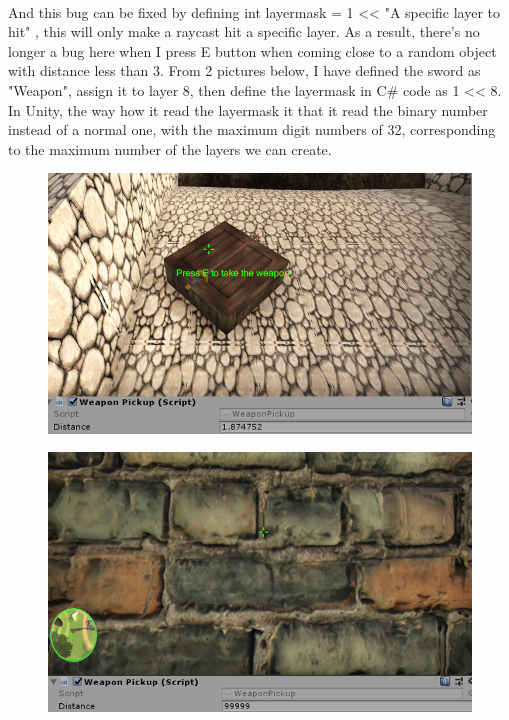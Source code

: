 \documentclass[a4paper, 13pt]{extarticle}
\begin{document}
{\begin{figure}[h]
\begin{minipage}{.5\textwidth}
			\label{fig:test40}
			\centering
		\end{minipage}
	\end{figure} \\
	And this bug can be fixed by defining int layermask = 1 << "A specific layer to hit" , this will only make a raycast hit a specific layer. As a result, there's no longer a bug here when I press E button when coming close to a random object with distance less than 3. From 2 pictures below, I have defined the sword as "Weapon", assign it to layer 8, then define the layermask in C\# code as 1 << 8. In Unity, the way how it read the layermask it that it read the binary number instead of a normal one, with the maximum digit numbers of 32, corresponding to the maximum number of the layers we can create. 
	 \begin{figure}[h!]
	 	\begin{minipage}{.5\textwidth}
	 		\centering
	 		\includegraphics[width=1\linewidth]{intructions/it_works1.png}
	 		\label{fig:test41}
	 	\end{minipage}
 		\begin{minipage}{.5\textwidth}
 		\centering
 		\includegraphics[width=1\linewidth]{intructions/it_works2.png}

\end{minipage}
\end{figure}}
\end{document}

